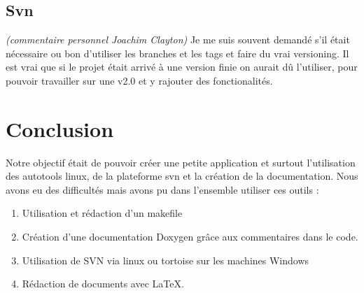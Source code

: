 \documentclass[a4paper 12pts]{article}
\begin{document}
\subsection{Svn}

\emph{(commentaire personnel Joachim Clayton)}
Je me suis souvent demandé s'il était nécessaire ou bon d'utiliser les branches et les tags et faire du vrai versioning. 
Il est vrai que si le projet était arrivé à une version finie on aurait dû l'utiliser, pour pouvoir travailler sur une v2.0 et y rajouter des fonctionalités.



\section{Conclusion}

Notre objectif était de pouvoir créer une petite application et surtout l'utilisation des autotools linux, de la plateforme svn et la création de la documentation.
Nous avons eu des difficultés mais avons pu dans l'ensemble utiliser ces outils : 

\begin{enumerate}
\item Utilisation et rédaction d'un makefile 
\item Création d'une documentation Doxygen grâce aux commentaires dans le code.
\item Utilisation de SVN via linux ou tortoise sur les machines Windows
\item Rédaction de documents avec \LaTeX.
\end{enumerate}
\end{document}
